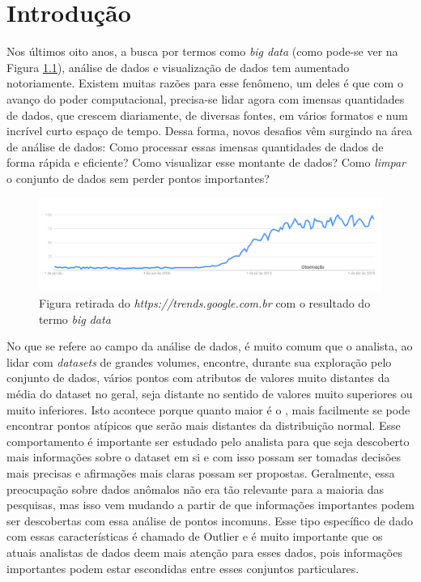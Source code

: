 \chapter{Introdução}
\label{chap:introducao}

Nos últimos oito anos, a busca por termos como \textit{big data} (como pode-se ver na Figura \ref{fig:google-trend}), análise de dados e visualização de dados tem aumentado notoriamente. Existem muitas razões para esse fenômeno, um deles é que com o avanço do poder computacional, precisa-se lidar agora com imensas quantidades de dados, que crescem diariamente, de diversas fontes, em vários formatos e num incrível curto espaço de tempo. Dessa forma, novos desafios vêm surgindo na área de análise de dados: Como processar essas imensas quantidades de dados de forma rápida e eficiente? Como visualizar esse montante de dados? Como \textit{limpar} o conjunto de dados sem perder pontos importantes?

\begin{figure}[!h]
	\centering
	\includegraphics[width=\textwidth]{images/google-trend-big-data.png}
	\caption{Figura retirada do \textit{https://trends.google.com.br} com o resultado do termo \textit{big data}}
	\label{fig:google-trend}
	\vspace{-10pt}
\end{figure}

No que se refere ao campo da análise de dados, é muito comum que o analista, ao lidar com \textit{datasets} de grandes volumes, encontre, durante sua exploração pelo conjunto de dados, vários pontos com atributos de valores muito distantes da média do dataset no geral, seja distante no sentido de valores muito superiores ou muito inferiores. Isto acontece porque quanto maior é o , mais facilmente se pode encontrar pontos atípicos que serão mais distantes da distribuição normal. Esse comportamento é importante ser estudado pelo analista para que seja descoberto mais informações sobre o dataset em si e com isso possam ser tomadas decisões mais precisas e afirmações mais claras possam ser propostas. Geralmente, essa preocupação sobre dados anômalos não era tão relevante para a maioria das pesquisas, mas isso vem mudando a partir de que informações importantes podem ser descobertas com essa análise de pontos incomuns. Esse tipo específico de dado com essas características é chamado de Outlier e é muito importante que os atuais analistas de dados deem mais atenção para esses dados, pois informações importantes podem estar escondidas entre esses conjuntos particulares.

